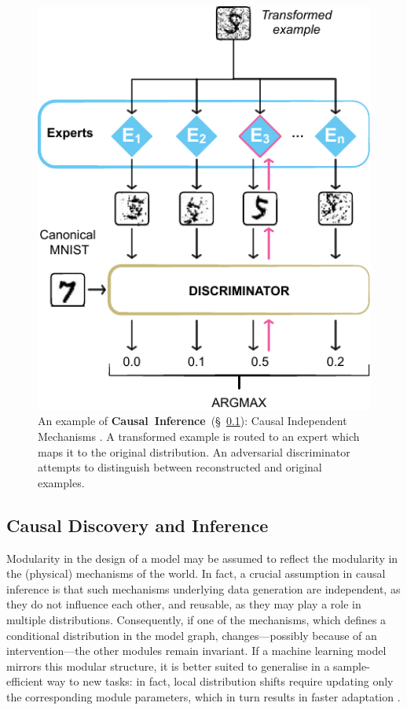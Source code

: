 \documentclass[10pt]{article} %
\begin{document}
    \begin{figure}[t]
    \centering
        \includegraphics[width=.4\linewidth]{img/schema_causal}  
        \caption{An example of \textbf{Causal~Inference}~(\S~\ref{ssec:causal}): Causal Independent Mechanisms \citep{parascandolo2018learning}. A transformed example is routed to an expert which maps it to the original distribution. An adversarial discriminator attempts to distinguish between reconstructed and original examples.}
        \label{fig:purpose_modularity:causal}
    \end{figure}

\subsection{Causal Discovery and Inference}
\label{ssec:causal}

Modularity in the design of a model may be assumed to reflect the modularity in the (physical) mechanisms of the world. In fact, a crucial assumption in causal inference \citep{ScholkopfJPSZM12} is that such mechanisms underlying data generation are independent, as they do not influence each other, and reusable, as they may play a role in multiple distributions. Consequently, if one of the mechanisms, which defines a conditional distribution in the model graph, changes---possibly because of an intervention---the other modules remain invariant. If a machine learning model mirrors this modular structure, it is better suited to generalise in a sample-efficient way to new tasks: in fact, local distribution shifts require updating only the corresponding module parameters, which in turn results in faster adaptation \citep{Bengio2020meta,mittal2022is}.
\end{document}
